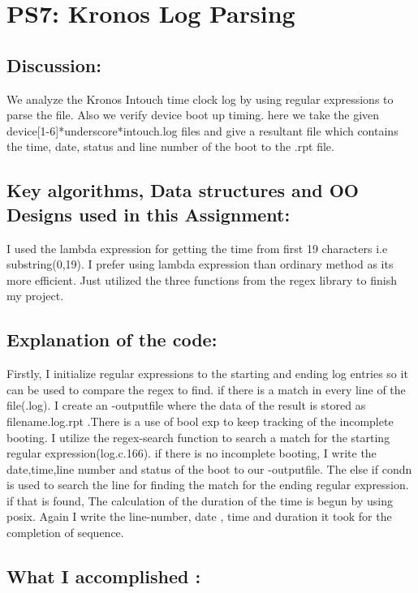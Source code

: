 \section{PS7: Kronos Log Parsing}\label{sec:ps7}
\graphicspath{{ps7}}
\subsection{Discussion:}\label{sec:ps7:disc}
    We analyze the Kronos Intouch time clock log by using regular expressions to parse the file.
    Also we verify device boot up timing.
    here we take the given device[1-6]*underscore*intouch.log files and give a resultant file which contains the time, date, status and line number of the boot to the .rpt file.

\subsection{Key algorithms, Data structures and OO Designs used in this Assignment:}
    I used the lambda expression for getting the time from first 19 characters i.e substring(0,19).
    I prefer using lambda expression than ordinary method as its more efficient.
    Just utilized the three functions from the regex library to finish my project.
\subsection{Explanation of the code:}
    Firstly, I initialize regular expressions to the starting and ending log entries so it can be used to compare the regex to find.
    if there is a match in every line of the file(.log). I create an -outputfile where the data of the result is stored as filename.log.rpt .There is a use of bool exp to keep tracking of the incomplete booting. I utilize the regex-search function to search a match for the starting regular expression(log.c.166). 
    if there is no incomplete booting, I write the date,time,line number and status of the boot to our -outputfile. The else if condn is used to search the line for finding the match for the ending regular expression. if that is found, The calculation of the duration of the time is begun by using posix. Again I write the line-number, date , time and duration it took for the completion of sequence.

\subsection{What I accomplished :}

